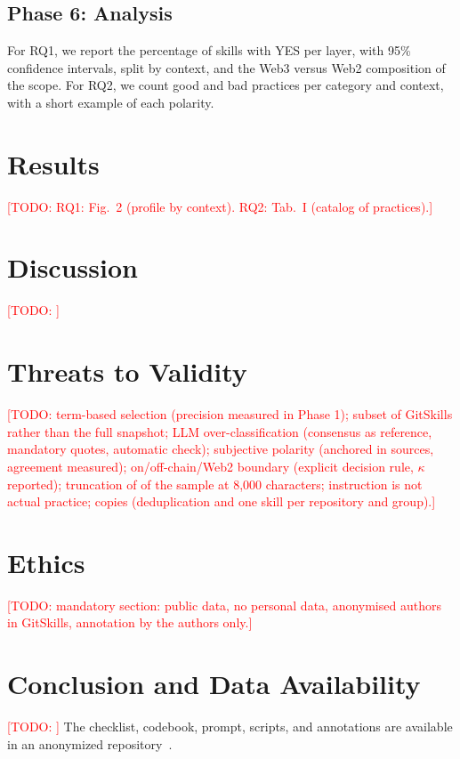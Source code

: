 \documentclass[10pt,conference]{IEEEtran}
\newcommand{\todo}[1]{\textcolor{red}{[TODO: #1]}}
\begin{document}
\subsection{Phase 6: Analysis}
\label{sec:analysis}

For RQ1, we report the percentage of skills with YES per layer, with 95\% confidence intervals, split by context, and the Web3 versus Web2 composition of the scope. For RQ2, we count good and bad practices per category and context, with a short example of each polarity.

\section{Results}
\label{sec:results}
\todo{RQ1: Fig.~2 (profile by context). RQ2: Tab.~I (catalog of practices).}

\section{Discussion}
\label{sec:discussion}
\todo{}

\section{Threats to Validity}
\label{sec:threats}
\todo{term-based selection (precision measured in Phase 1); subset of GitSkills rather than the full snapshot; LLM over-classification (consensus as reference, mandatory quotes, automatic check); subjective polarity (anchored in sources, agreement measured); on/off-chain/Web2 boundary (explicit decision rule, $\kappa$ reported); truncation of \PctTrunc of the sample at 8,000 characters; instruction is not actual practice; copies (deduplication and one skill per repository and group).}

\section{Ethics}
\label{sec:ethics}
\todo{mandatory section: public data, no personal data, anonymised authors in GitSkills, annotation by the authors only.}

\section{Conclusion and Data Availability}
\label{sec:conclusion}
\todo{} The checklist, codebook, prompt, scripts, and annotations are available in an anonymized repository~\cite{replication}.

\balance


\end{document}
